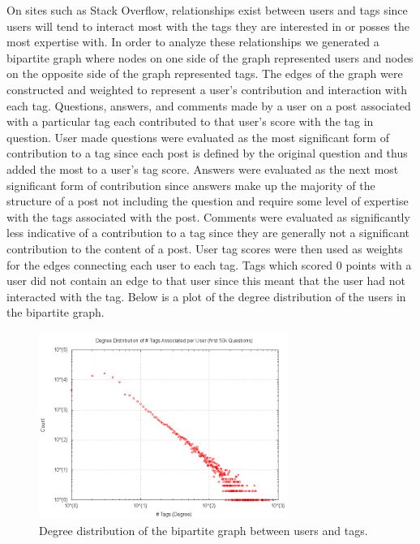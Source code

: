 \documentclass[10pt]{IEEEtran}
\begin{document}
On sites such as Stack Overflow, relationships exist between users and tags since users will tend to interact most with the tags they are interested in or posses the most expertise with. In order to analyze these relationships we generated a bipartite graph where nodes on one side of the graph represented users and nodes on the opposite side of the graph represented tags. The edges of the graph were constructed and weighted to represent a user’s contribution and interaction with each tag. Questions, answers, and comments made by a user on a post associated with a particular tag each contributed to that user’s score with the tag in question. User made questions were evaluated as the most significant form of contribution to a tag since each post is defined by the original question and thus added the most to a user’s tag score. Answers were evaluated as the next most significant form of contribution since answers make up the majority of the structure of a post not including the question and require some level of expertise with the tags associated with the post. Comments were evaluated as significantly less indicative of a contribution to a tag since they are generally not a significant contribution to the content of a post. User tag scores were then used as weights for the edges connecting each user to each tag. Tags which scored 0 points with a user did not contain an edge to that user since this meant that the user had not interacted with the tag. Below is a plot of the degree distribution of the users in the bipartite graph.

\begin{figure}[h]
  \centering
    \includegraphics[width=3.2in]{bipartite_degdistr.png}
  \caption{Degree distribution of the bipartite graph between users and tags.}
  \label{fig:bi_dd}
\end{figure}
\end{document}
